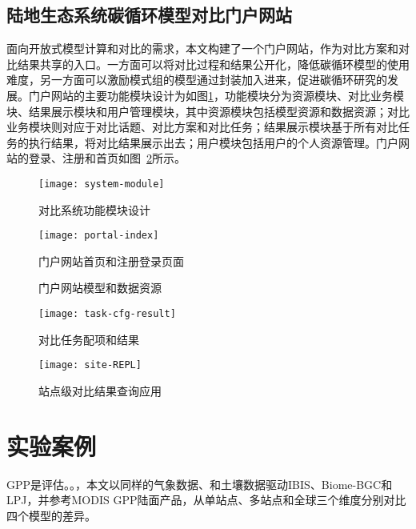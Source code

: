 \subsection{陆地生态系统碳循环模型对比门户网站}
面向开放式模型计算和对比的需求，本文构建了一个门户网站，作为对比方案和对比结果共享的入口。一方面可以将对比过程和结果公开化，降低碳循环模型的使用难度，另一方面可以激励模式组的模型通过封装加入进来，促进碳循环研究的发展。门户网站的主要功能模块设计为如图\ref{fig:system-module}，功能模块分为资源模块、对比业务模块、结果展示模块和用户管理模块，其中资源模块包括模型资源和数据资源；对比业务模块则对应于对比话题、对比方案和对比任务；结果展示模块基于所有对比任务的执行结果，将对比结果展示出去；用户模块包括用户的个人资源管理。门户网站的登录、注册和首页如图~\ref{fig:portal-index}所示。

\begin{figure}[!htbp]
    \centering
    \texttt{[image: system-module]}
    \caption{对比系统功能模块设计}
    \label{fig:system-module}
\end{figure}

\begin{figure}[!htbp]
    \centering
    \texttt{[image: portal-index]}
    \caption{门户网站首页和注册登录页面}
    \label{fig:portal-index}
\end{figure}

\begin{figure}[!htbp]
    \centering
    \hfill
    \caption{门户网站模型和数据资源}
    \label{fig:portal-resource}
\end{figure}

\begin{figure}[!htbp]
    \centering
    \texttt{[image: task-cfg-result]}
    \caption{对比任务配项和结果}
    \label{fig:task-cfg-result}
\end{figure}

\begin{figure}[!htbp]
    \centering
    \texttt{[image: site-REPL]}
    \caption{站点级对比结果查询应用}
    \label{fig:site-REPL}
\end{figure}

\section{实验案例}
GPP是评估。。，本文以同样的气象数据、和土壤数据驱动IBIS、Biome-BGC和LPJ，并参考MODIS GPP陆面产品，从单站点、多站点和全球三个维度分别对比四个模型的差异。
